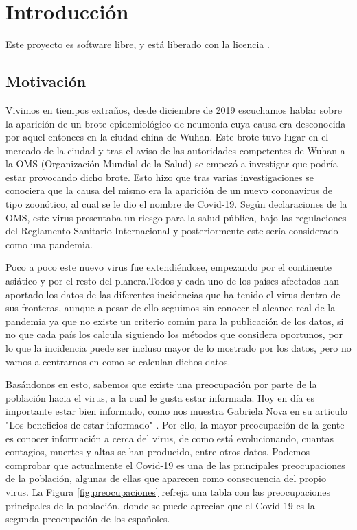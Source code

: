 \chapter{Introducción} \label{ch:introduccion}

Este proyecto es software libre, y está liberado con la licencia \cite{agplv3}.

\section{Motivación}

Vivimos en tiempos extraños, desde diciembre de 2019 escuchamos hablar sobre la aparición de un brote epidemiológico de neumonía cuya causa era desconocida por aquel entonces en la ciudad china de Wuhan. Este brote tuvo lugar en el mercado de la ciudad y tras el aviso de las autoridades competentes de Wuhan a la OMS (Organización Mundial de la Salud) se empezó a investigar que podría estar provocando dicho brote. Esto hizo que tras varias investigaciones se conociera que la causa del mismo era la aparición de un nuevo coronavirus \cite{oms-covid} de tipo zoonótico, al cual se le dio el nombre de Covid-19. Según declaraciones de la OMS, este virus presentaba un riesgo para la salud pública, bajo las regulaciones del Reglamento Sanitario Internacional \cite{reglamento-sanitario-internacional} y posteriormente este sería considerado como una pandemia.

Poco a poco este nuevo virus fue extendiéndose, empezando por el continente asiático y por el resto del planera.Todos y cada uno de los países afectados han aportado los datos de las diferentes incidencias que ha tenido el virus dentro de sus fronteras, aunque a pesar de ello seguimos sin conocer el alcance real de la pandemia ya que no existe un criterio común para la publicación de los datos, si no que cada país los calcula siguiendo los métodos que considera oportunos, por lo que la incidencia puede ser incluso mayor de lo mostrado por los datos, pero no vamos a centrarnos en como se calculan dichos datos.

Basándonos en esto, sabemos que existe una preocupación por parte de la población hacia el virus, a la cual le gusta estar informada. Hoy en día es importante estar bien informado, como nos muestra Gabriela Nova en su articulo "Los beneficios de estar informado" \cite{gabriela-nova}. Por ello, la mayor preocupación de la gente es conocer información a cerca del virus, de como está evolucionando, cuantas contagios, muertes y altas se han producido, entre otros datos. Podemos comprobar que actualmente el Covid-19 es una de las principales preocupaciones de la población, algunas de ellas que aparecen como consecuencia del propio virus. La Figura \ref{fig:preocupaciones} refreja una tabla con las preocupaciones principales de la población, donde se puede apreciar que el Covid-19 es la segunda preocupación de los españoles.

